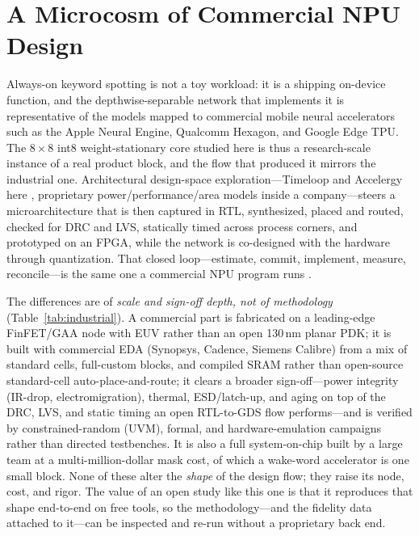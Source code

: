 \documentclass[conference]{IEEEtran}
\begin{document}
\section{A Microcosm of Commercial NPU Design}
Always-on keyword spotting is not a toy workload: it is a shipping on-device
function, and the depthwise-separable network that implements it is representative
of the models mapped to commercial mobile neural accelerators such as the Apple
Neural Engine, Qualcomm Hexagon, and Google Edge TPU. The $8\times8$ int8
weight-stationary core studied here is thus a research-scale instance of a real
product block, and the flow that produced it mirrors the industrial one.
Architectural design-space exploration---Timeloop and Accelergy here
\cite{timeloop,accelergy}, proprietary power/performance/area models inside a
company---steers a microarchitecture that is then captured in RTL, synthesized,
placed and routed, checked for DRC and LVS, statically timed across process
corners, and prototyped on an FPGA, while the network is co-designed with the
hardware through quantization. That closed loop---estimate, commit, implement,
measure, reconcile---is the same one a commercial NPU program runs
\cite{tpu,eyeriss,simba}.

The differences are of \emph{scale and sign-off depth, not of methodology}
(Table~\ref{tab:industrial}). A commercial part is fabricated on a leading-edge
FinFET/GAA node with EUV rather than an open 130\,nm planar PDK; it is built with
commercial EDA (Synopsys, Cadence, Siemens Calibre) from a mix of standard cells,
full-custom blocks, and compiled SRAM rather than open-source standard-cell
auto-place-and-route; it clears a broader sign-off---power integrity (IR-drop,
electromigration), thermal, ESD/latch-up, and aging on top of the DRC, LVS, and
static timing an open RTL-to-GDS flow performs---and is verified by
constrained-random (UVM), formal, and hardware-emulation campaigns rather than
directed testbenches. It is also a full system-on-chip built by a large team at a
multi-million-dollar mask cost, of which a wake-word accelerator is one small
block. None of these alter the \emph{shape} of the design flow; they raise its
node, cost, and rigor. The value of an open study like this one is that it
reproduces that shape end-to-end on free tools, so the methodology---and the
fidelity data attached to it---can be inspected and re-run without a proprietary
back end.
\end{document}
